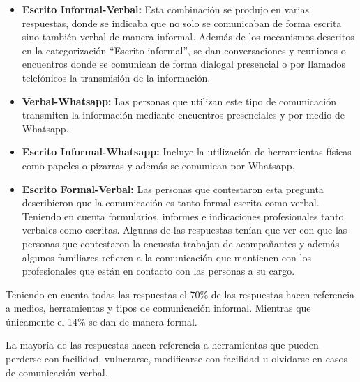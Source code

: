 \documentclass[a4paper,12pt]{article}
\begin{document}
    \begin{itemize}
        \item \textbf{Escrito Informal-Verbal:} Esta combinación se produjo en varias respuestas, donde se indicaba que no solo se comunicaban de forma escrita sino también verbal de manera informal. Además de los mecanismos descritos en la categorización “Escrito informal”, se dan conversaciones y reuniones o encuentros donde se comunican de forma dialogal presencial o por llamados telefónicos la transmisión de la información.
        \item \textbf{Verbal-Whatsapp:} Las personas que utilizan este tipo de comunicación transmiten la información mediante encuentros presenciales y por medio de Whatsapp.
        \item \textbf{Escrito Informal-Whatsapp:} Incluye la utilización de herramientas físicas como papeles o pizarras y además se comunican por Whatsapp.
        \item \textbf{Escrito Formal-Verbal:} Las personas que contestaron esta pregunta describieron que la comunicación es tanto formal escrita como verbal. Teniendo en cuenta formularios, informes e indicaciones profesionales tanto verbales como escritas. Algunas de las respuestas tenían que ver con que las personas que contestaron la encuesta trabajan de acompañantes y además algunos familiares refieren a la comunicación que mantienen con los profesionales que están en contacto con las personas a su cargo.
    \end{itemize}
    \par Teniendo en cuenta todas las respuestas el 70\% de las respuestas hacen referencia a medios, herramientas y tipos de comunicación informal. Mientras que únicamente el 14\% se dan de manera formal.
    \par La mayoría de las respuestas hacen referencia a herramientas que pueden perderse con facilidad, vulnerarse, modificarse con facilidad u olvidarse en casos de comunicación verbal.
\end{document}
